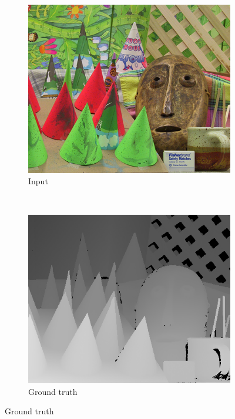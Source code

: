 \begin{figure}
  \setcounter{subfigure}{0}

  \label{fig:grid-of-outputs-cones}
  \centering


  \begin{subfigure}[b]{0.45\textwidth}
    \centering
    \includegraphics[width=\textwidth]{images/stereo-pairs/cones_imL.png}
    \caption{Input}
  \end{subfigure}
  ~
  \begin{subfigure}[b]{0.45\textwidth}
    \centering
    \includegraphics[width=\textwidth]{images/stereo-pairs/cones_groundtruth.png}
    \caption{Ground truth}
  \end{subfigure}


\end{figure}
